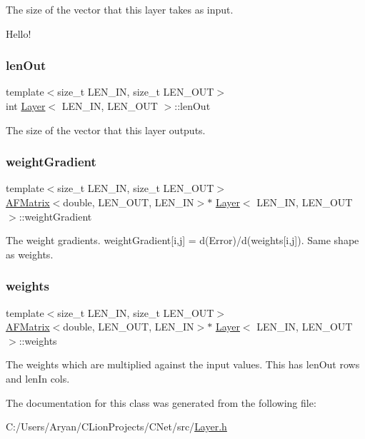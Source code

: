 The size of the vector that this layer takes as input. 

Hello! \mbox{\label{class_layer_ae10a61035ba7a18f9f2a6d1d3ebf9811}} 
\subsubsection{\texorpdfstring{len\+Out}{lenOut}}
{\footnotesize\ttfamily template$<$size\+\_\+t L\+E\+N\+\_\+\+IN, size\+\_\+t L\+E\+N\+\_\+\+O\+UT$>$ \\
int \hyperlink{class_layer}{Layer}$<$ L\+E\+N\+\_\+\+IN, L\+E\+N\+\_\+\+O\+UT $>$\+::len\+Out}



The size of the vector that this layer outputs. 

\mbox{\label{class_layer_ab4afc6b6fdda2b5fd21621f40be776fd}} 
\subsubsection{\texorpdfstring{weight\+Gradient}{weightGradient}}
{\footnotesize\ttfamily template$<$size\+\_\+t L\+E\+N\+\_\+\+IN, size\+\_\+t L\+E\+N\+\_\+\+O\+UT$>$ \\
\hyperlink{class_a_f_matrix}{A\+F\+Matrix}$<$double, L\+E\+N\+\_\+\+O\+UT, L\+E\+N\+\_\+\+IN$>$$\ast$ \hyperlink{class_layer}{Layer}$<$ L\+E\+N\+\_\+\+IN, L\+E\+N\+\_\+\+O\+UT $>$\+::weight\+Gradient}



The weight gradients. {\ttfamily weight\+Gradient\mbox{[}i,j\mbox{]} = d(\+Error)/d(weights\mbox{[}i,j\mbox{]})}. Same shape as {\ttfamily weights}. 

\mbox{\label{class_layer_aa362ee5edaf5b0fe8d5d7c4674ded7a1}} 
\subsubsection{\texorpdfstring{weights}{weights}}
{\footnotesize\ttfamily template$<$size\+\_\+t L\+E\+N\+\_\+\+IN, size\+\_\+t L\+E\+N\+\_\+\+O\+UT$>$ \\
\hyperlink{class_a_f_matrix}{A\+F\+Matrix}$<$double, L\+E\+N\+\_\+\+O\+UT, L\+E\+N\+\_\+\+IN$>$$\ast$ \hyperlink{class_layer}{Layer}$<$ L\+E\+N\+\_\+\+IN, L\+E\+N\+\_\+\+O\+UT $>$\+::weights}



The weights which are multiplied against the input values. This has {\ttfamily len\+Out} rows and {\ttfamily len\+In} cols. 



The documentation for this class was generated from the following file\+:\begin{DoxyCompactItemize}
\item 
C\+:/\+Users/\+Aryan/\+C\+Lion\+Projects/\+C\+Net/src/\hyperlink{_layer_8h}{Layer.\+h}\end{DoxyCompactItemize}
